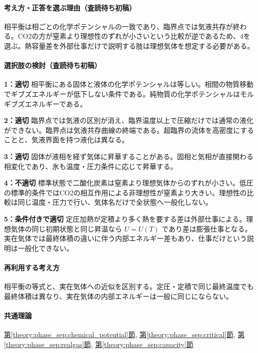\paragraph{考え方・正答を選ぶ理由（査読待ち初稿）} 相平衡は相ごとの化学ポテンシャルの一致であり、臨界点では気液共存が終わる。CO2の方が窒素より理想性のずれが小さいという比較が逆であるため、4を選ぶ。熱容量差を外部仕事だけで説明する肢は理想気体を想定する必要がある。

\paragraph{選択肢の検討（査読待ち初稿）}\mbox{}\par

\noindent\textbf{1：適切} 相平衡にある固体と液体の化学ポテンシャルは等しい。相間の物質移動でギブズエネルギーが低下しない条件である。純物質の化学ポテンシャルはモルギブズエネルギーである。\par

\noindent\textbf{2：適切} 臨界点では気液の区別が消え、臨界温度以上で圧縮だけでは通常の液化ができない。臨界点は気液共存曲線の終端である。超臨界の流体を高密度にすることと、気液界面を持つ液化は異なる。\par

\noindent\textbf{3：適切} 固体が液相を経ず気体に昇華することがある。固相と気相が直接関わる相変化であり、氷も温度・圧力条件に応じて昇華する。\par

\noindent\textbf{4：不適切} 標準状態で二酸化炭素は窒素より理想気体からのずれが小さい。低圧の標準的条件ではCO2の相互作用による非理想性が窒素より大きい。理想性の比較は同じ温度・圧力で行い、気体名だけで全状態へ一般化しない。\par

\noindent\textbf{5：条件付きで適切} 定圧加熱が定積より多く熱を要する差は外部仕事による。理想気体の同じ初期状態と同じ昇温なら \(U=U(T)\) であり差は膨張仕事となる。実在気体では最終体積の違いに伴う内部エネルギー差もあり、仕事だけという説明は一般化できない。\par

\paragraph{再利用する考え方} 相平衡の等式と、実在気体への近似を区別する。定圧・定積で同じ最終温度でも最終体積は異なり、実在気体の内部エネルギーは一般に同じにならない。

\paragraph{共通理論} \hyperref[theory:phase_sep:chemical_potential]{第\ref*{theory:phase_sep:chemical_potential}節}, \hyperref[theory:phase_sep:critical]{第\ref*{theory:phase_sep:critical}節}, \hyperref[theory:phase_sep:realgas]{第\ref*{theory:phase_sep:realgas}節}, \hyperref[theory:phase_sep:capacity]{第\ref*{theory:phase_sep:capacity}節}

